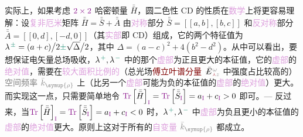实际上，如果考虑 $\textcolor{Plum}{2 \times 2}$ \textcolor{NavyBlue}{哈密顿量} $\bar{\bar{H}}$，\textcolor{NavyBlue}{圆二色性 CD} 的性质在\textcolor{Plum}{数学}上将更容易理解：设\textcolor{Plum}{复非厄米}矩阵 $\bar{\bar{H}} = \bar{\bar{S}} + \bar{\bar{A}}$ 由\textcolor{Plum}{对称}部分 $\bar{\bar{S}} = \left[ \left[ a,b \right],\left[ b,c \right] \right]$ 和\textcolor{Plum}{反对称}部分 $\bar{\bar{A}} = \left[ \left[ 0,d \right],\left[ -d,0 \right] \right]$（其\textcolor{Plum}{实部}即 \textcolor{NavyBlue}{CD}）组成，它的两个\textcolor{PineGreen}{特征值}为 $\lambda^{\;\!\textcolor{PineGreen}{\pm}} = (a+c) \big/ 2 \textcolor{PineGreen}{\pm} \sqrt{\Delta} \big/ 2$，其中 $\Delta = \left( a-c \right)^2 + 4 \left( b^2 - d^2 \right)$。从中可以看出，要想保证\textcolor{PineGreen}{电矢量总场}\textcolor{NavyBlue}{吸收}，$\lambda^{\;\!\textcolor{PineGreen}{+}}, \lambda^{\;\!\textcolor{PineGreen}{-}}$ 中的那个\textcolor{Plum}{虚部}为正且更大的\textcolor{PineGreen}{本征值}，它的\textcolor{Plum}{虚部}的\textcolor{Plum}{绝对值}，需要在\textcolor{Plum}{较大面积比例的}（\textcolor{PineGreen}{总光场}\textcolor{Maroon}{傅立叶谱分量} $\xint{\mathcolor{gray}{-}}{25}{\bar{E}}^{\;\!\mathcolor{gray}{\omega}}_{\;\! \textcolor{Maroon}{\Yup} \mathcolor{gray}{z}}$ 中\textcolor{NavyBlue}{强度}占比较高的）\textcolor{gray}{空间频率} $\mathcolor{gray}{\bar{k}_{\symup{\rho}}}$ 上（比另一个\textcolor{Plum}{虚部}可能为负的\textcolor{PineGreen}{本征值}的\textcolor{Plum}{虚部}的\textcolor{Plum}{绝对值}）更大。而实现这一点，只需要简单地令 $\textcolor{Plum}{\text{Tr}} \left[ \bar{\bar{H}} \right]_{\textcolor{Plum}{\text{I}}} = \textcolor{Plum}{\text{Tr}} \left[ \bar{\bar{S}}_{\textcolor{Plum}{\text{I}}} \right] = a_{\textcolor{Plum}{\text{I}}} + c_{\textcolor{Plum}{\text{I}}} > 0$ 即可\cite{berryOpticalSingularitiesBirefringent2003}。--- 反过来，当$\textcolor{Plum}{\text{Tr}} \left[ \bar{\bar{H}} \right]_{\textcolor{Plum}{\text{I}}} = \textcolor{Plum}{\text{Tr}} \left[ \bar{\bar{S}}_{\textcolor{Plum}{\text{I}}} \right] = a_{\textcolor{Plum}{\text{I}}} + c_{\textcolor{Plum}{\text{I}}} < 0$ 时，$\lambda^{\;\!\textcolor{PineGreen}{+}}, \lambda^{\;\!\textcolor{PineGreen}{-}}$ 中\textcolor{Plum}{虚部}为负且更小的\textcolor{PineGreen}{本征值}的\textcolor{Plum}{虚部}的\textcolor{Plum}{绝对值}更大。原则上这对于所有的\textcolor{Plum}{自变量} $\mathcolor{gray}{\bar{k}_{\symup{\rho}}}$ 都成立。

